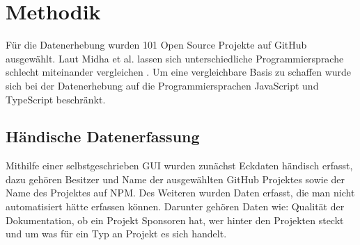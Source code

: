 \chapter{Methodik}

\bigskip


Für die Datenerhebung wurden 101 Open Source Projekte auf GitHub ausgewählt.
Laut Midha et al. lassen sich unterschiedliche Programmiersprache schlecht miteinander vergleichen
\cite{midhaFactorsAffectingSuccess2012}. Um eine vergleichbare Basis zu schaffen wurde sich bei der
Datenerhebung auf die Programmiersprachen JavaScript und TypeScript beschränkt.








\section{Händische Datenerfassung}



\bigskip
\noindent
Mithilfe einer selbstgeschrieben GUI wurden zunächst Eckdaten händisch erfasst, dazu gehören Besitzer und Name
der ausgewählten GitHub Projektes sowie der Name des Projektes auf NPM. Des Weiteren wurden Daten erfasst, die
man nicht automatisiert hätte erfassen können. Darunter gehören Daten wie: Qualität der Dokumentation, ob ein
Projekt Sponsoren hat, wer hinter den Projekten steckt und um was für ein Typ an Projekt es sich handelt.


